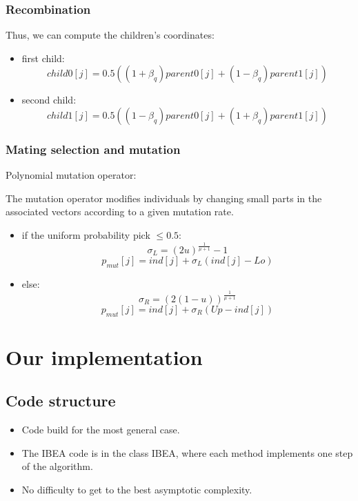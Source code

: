 \documentclass{beamer}
\begin{document}
\begin{frame}
\frametitle{Recombination}
Thus, we can compute the children's coordinates:
 
\begin{itemize}
\item first child:
\begin{equation}
child0[j] = 0.5((1+\beta_q)parent0[j]+(1-\beta_q)parent1[j])
\end{equation}
\item second child:
\begin{equation}
child1[j] = 0.5((1-\beta_q)parent0[j]+(1+\beta_q)parent1[j])
\end{equation}
\end{itemize}

\end{frame}

\begin{frame}
\frametitle{Mating selection and mutation}
Polynomial mutation operator:

The mutation operator modifies individuals by changing small parts in the associated vectors according to a given mutation rate.

\begin{itemize}
\item if the uniform probability pick $\leq 0.5$:
\begin{equation}
\sigma_L = (2u)^{\frac{1}{\mu +1}}-1 
\end{equation}
\begin{equation}
p_{mut}[j] = ind[j] + \sigma_L(ind[j]-Lo)
\end{equation}
\item else:
\begin{equation}
\sigma_R = (2(1-u))^{\frac{1}{\mu +1}} 
\end{equation}
\begin{equation}
p_{mut}[j] = ind[j] + \sigma_R(Up-ind[j])
\end{equation}
\end{itemize}

\end{frame}

\section{Our implementation}
\subsection{Code structure}
\begin{frame}
  \begin{itemize}
    \item Code build for the most general case.
    \item The IBEA code is in the class IBEA, where each method implements one step of the algorithm.
    \item No difficulty to get to the best asymptotic complexity.
  \end{itemize}
\end{frame}
\end{document}
